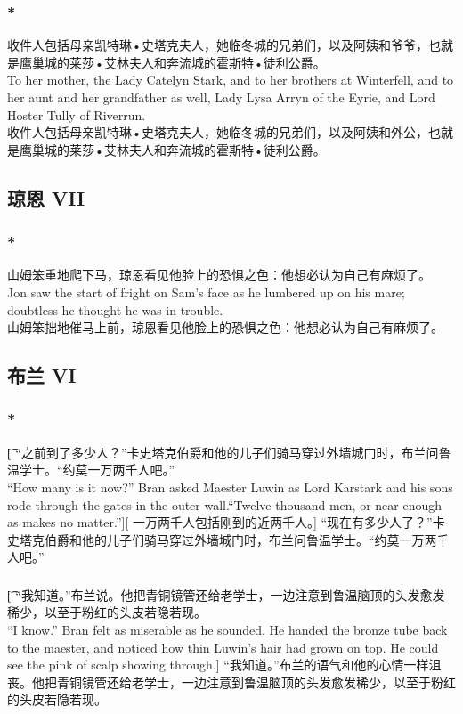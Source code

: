 \documentclass[12pt,a4paper]{article}
\newcommand{\la}[1]{{\color{blue}#1}\\}
\begin{document}
\subsubsection{\color{red}*}\la{
	收件人包括母亲凯特琳•史塔克夫人，她临冬城的兄弟们，以及阿姨和爷爷，也就是鹰巢城的莱莎•艾林夫人和奔流城的霍斯特•徒利公爵。\\
	To her mother, the Lady Catelyn Stark, and to her brothers at Winterfell, and to her aunt and her grandfather as well, Lady Lysa Arryn of the Eyrie, and Lord Hoster Tully of Riverrun.}
	收件人包括母亲凯特琳•史塔克夫人，她临冬城的兄弟们，以及阿姨和外公，也就是鹰巢城的莱莎•艾林夫人和奔流城的霍斯特•徒利公爵。
		
\subsection{琼恩 VII}
\subsubsection{\color{red}*}\la{
	山姆笨重地爬下马，琼恩看见他脸上的恐惧之色：他想必认为自己有麻烦了。\\
	Jon saw the start of fright on Sam's face as he lumbered up on his mare; doubtless he thought he was in trouble. }
	山姆笨拙地催马上前，琼恩看见他脸上的恐惧之色：他想必认为自己有麻烦了。

\subsection{布兰 VI}
\subsubsection{\color{red}*}\t[
“之前到了多少人？”卡史塔克伯爵和他的儿子们骑马穿过外墙城门时，布兰问鲁温学士。“约莫一万两千人吧。”\\
“How many is it now?” Bran asked Maester Luwin as Lord Karstark and his sons rode through the gates in the outer wall.“Twelve thousand men, or near enough as makes no matter.”][
一万两千人包括刚到的近两千人。]
“现在有多少人了？”卡史塔克伯爵和他的儿子们骑马穿过外墙城门时，布兰问鲁温学士。“约莫一万两千人吧。”

\subsubsection{}\t[
 “我知道。”布兰说。他把青铜镜管还给老学士，一边注意到鲁温脑顶的头发愈发稀少，以至于粉红的头皮若隐若现。\\
 “I know.” Bran felt as miserable as he sounded. He handed the bronze tube back to the maester, and noticed how thin Luwin's hair had grown on top. He could see the pink of scalp showing through.]
 “我知道。”布兰的语气和他的心情一样沮丧。他把青铜镜管还给老学士，一边注意到鲁温脑顶的头发愈发稀少，以至于粉红的头皮若隐若现。
\end{document}
